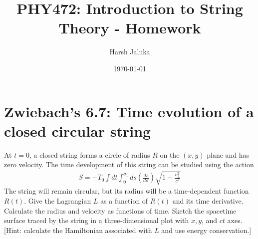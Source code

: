 \documentclass[11pt]{article}
\title{PHY472: Introduction to String Theory - Homework}
\author{Harsh Jaluka}
\date{\today}
\begin{document}
\begin{titlepage}
\maketitle 
\end{titlepage}

\newpage 
\tableofcontents

\newpage 
\section{Zwiebach's 6.7: Time evolution of a closed circular string}
At $t = 0$, a closed string forms a circle of radius $R$ on the $(x,y)$ plane and has zero velocity. The time development of this string can be studied using the action 
\begin{align*}
    S = -T_0 \int dt \int_0^{\sigma_1} ds  \left( \frac{ds}{d\sigma}\right) \sqrt{1 - \frac{v_\perp^2}{c^2}} \tag{Zwiebach 6.88}
\end{align*}
The string will remain circular, but its radius will be a time-dependent function $R(t)$. Give the Lagrangian $L$ as a function of $R(t)$ and its time derivative. Calculate the radius and velocity as functions of time. Sketch the spacetime surface traced by the string in a three-dimensional plot with $x,y$, and $ct$ axes. [Hint: calculate the Hamiltonian associated with $L$ and use energy conservation.]
\end{document}
